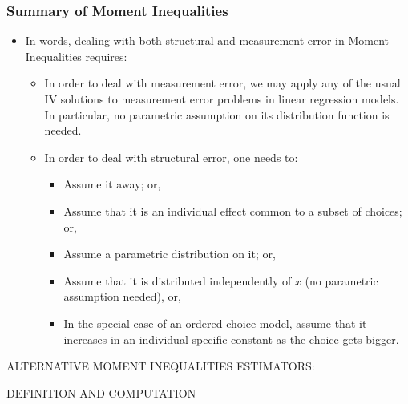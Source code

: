 \documentclass[10pt,letterpaper]{beamer}
\begin{document}
\begin{frame}
\frametitle{Summary of Moment Inequalities}

\begin{itemize}
	\item In words, dealing with both structural and measurement error in Moment Inequalities requires:
	\begin{itemize}
		\item In order to deal with measurement error, we may apply any of the usual IV solutions to measurement error problems in linear regression models. In particular, no parametric assumption on its distribution function is needed.
		\item In order to deal with structural error, one needs to:
		\begin{itemize}
			\item Assume it away; or,
			\item Assume that it is an individual effect common to a subset of choices; or,
			\item Assume a parametric distribution on it; or,
			\item Assume that it is distributed independently of $x$ (no parametric assumption needed), or,
			\item In the special case of an ordered choice model, assume that it increases in an individual specific constant as the choice gets bigger.
		\end{itemize}
	\end{itemize}
\end{itemize}
\end{frame}
\begin{frame}
\centerline{ALTERNATIVE MOMENT INEQUALITIES ESTIMATORS:}
\centerline{DEFINITION AND COMPUTATION}
\end{frame}
\end{document}
